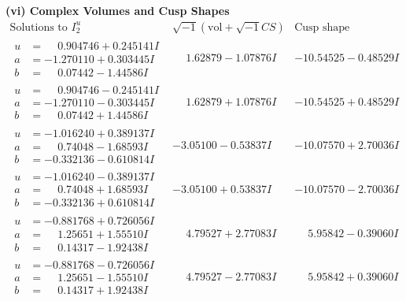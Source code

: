 \documentclass[1p]{elsarticle_modified}
\theoremstyle{definition}
\newcommand{\I}{\sqrt{-1}}
\begin{document}
\newpage\flushleft \textbf{(vi) Complex Volumes and Cusp Shapes}
$$\begin{array}{c|c|c}  
\text{Solutions to }I^u_{2}& \I (\text{vol} + \sqrt{-1}CS) & \text{Cusp shape}\\
 \hline 
\begin{aligned}
u &= \phantom{-}0.904746 + 0.245141 I \\
a &= -1.270110 + 0.303445 I \\
b &= \phantom{-}0.07442 - 1.44586 I\end{aligned}
 & \phantom{-}1.62879 - 1.07876 I & -10.54525 - 0.48529 I \\ \hline\begin{aligned}
u &= \phantom{-}0.904746 - 0.245141 I \\
a &= -1.270110 - 0.303445 I \\
b &= \phantom{-}0.07442 + 1.44586 I\end{aligned}
 & \phantom{-}1.62879 + 1.07876 I & -10.54525 + 0.48529 I \\ \hline\begin{aligned}
u &= -1.016240 + 0.389137 I \\
a &= \phantom{-}0.74048 - 1.68593 I \\
b &= -0.332136 - 0.610814 I\end{aligned}
 & -3.05100 - 0.53837 I & -10.07570 + 2.70036 I \\ \hline\begin{aligned}
u &= -1.016240 - 0.389137 I \\
a &= \phantom{-}0.74048 + 1.68593 I \\
b &= -0.332136 + 0.610814 I\end{aligned}
 & -3.05100 + 0.53837 I & -10.07570 - 2.70036 I \\ \hline\begin{aligned}
u &= -0.881768 + 0.726056 I \\
a &= \phantom{-}1.25651 + 1.55510 I \\
b &= \phantom{-}0.14317 - 1.92438 I\end{aligned}
 & \phantom{-}4.79527 + 2.77083 I & \phantom{-}5.95842 - 0.39060 I \\ \hline\begin{aligned}
u &= -0.881768 - 0.726056 I \\
a &= \phantom{-}1.25651 - 1.55510 I \\
b &= \phantom{-}0.14317 + 1.92438 I\end{aligned}
 & \phantom{-}4.79527 - 2.77083 I & \phantom{-}5.95842 + 0.39060 I \\ \hline\begin{aligned}

\end{aligned}
\end{array}$$
\end{document}
